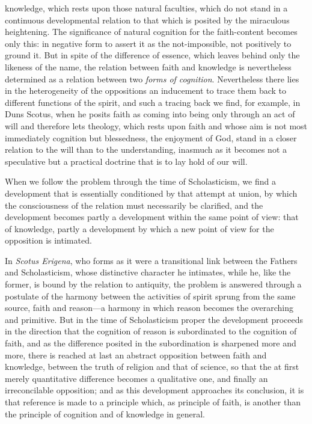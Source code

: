 \documentclass[12pt,a4paper]{book}
\begin{document}
knowledge, which rests upon those natural faculties, which do not stand in a
continuous developmental relation to that which is posited by the miraculous
heightening. The significance of natural cognition for the faith-content
becomes only this: in negative form to assert it as the not-impossible, not
positively to ground it. But in spite of the difference of essence, which
leaves behind only the likeness of the name, the relation between faith and
knowledge is nevertheless determined as a relation between two \emph{forms of
cognition}. Nevertheless there lies in the heterogeneity of the oppositions an
inducement to trace them back to different functions of the spirit, and such
a tracing back we find, for example, in Duns Scotus, when he posits faith as
coming into being only through an act of will and therefore lets theology,
which rests upon faith and whose aim is not most immediately cognition but
blessedness, the enjoyment of God, stand in a closer relation to the will
than to the understanding, inasmuch as it becomes not a speculative but a
practical doctrine that is to lay hold of our will.

When we follow the problem through the time of Scholasticism, we find a
development that is essentially conditioned by that attempt at union, by which
the consciousness of the relation must necessarily be clarified, and the
development becomes partly a development within the same point of view: that
of knowledge, partly a development by which a new point of view for the
opposition is intimated.

In \emph{Scotus Erigena}, who forms as it were a transitional link between the
Fathers and Scholasticism, whose distinctive character he intimates, while
he, like the former, is bound by the relation to antiquity, the problem is answered
through a postulate of the harmony between the activities of spirit sprung
from the same source, faith and reason---a harmony in which reason becomes
the overarching and primitive. But in the time of Scholasticism proper the
development proceeds in the direction that the cognition of reason is
subordinated to the cognition of faith, and as the difference posited in the
subordination is sharpened more and more, there is reached at last an
abstract opposition between faith and knowledge, between the truth of
religion and that of science, so that the at first merely quantitative
difference becomes a qualitative one, and finally an irreconcilable
opposition; and as this development approaches its conclusion, it is that
reference is made to a principle which, as principle of faith, is another than
the principle of cognition and of knowledge in general.
\end{document}
